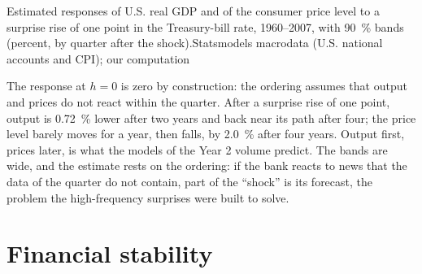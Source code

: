 \begin{omchart}{Estimated responses of U.S. real GDP and of the consumer price level to a
surprise rise of one point in the Treasury-bill rate, 1960--2007, with 90~\% bands
(percent, by quarter after the shock).}{Statsmodels macrodata (U.S. national accounts
and CPI); our computation}
\end{omchart}

The response at $h = 0$ is zero by construction: the ordering assumes that output
and prices do not react within the quarter. After a surprise rise of one point,
output is 0.72~\% lower after two years and back near its path after four; the price
level barely moves for a year, then falls, by 2.0~\% after four years. Output first,
prices later, is what the models of the Year 2 volume predict. The bands are wide,
and the estimate rests on the ordering: if the bank reacts to news that the data of
the quarter do not contain, part of the ``shock'' is its forecast, the problem the
high-frequency surprises were built to solve.

\section{Financial stability}\label{sec:b3:central-banking:macroprudential}

